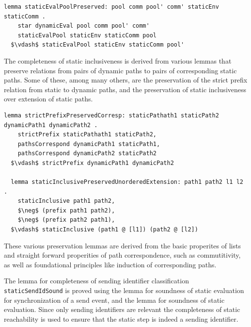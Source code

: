 \documentclass[letterpaper, 11pt]{extarticle}
\begin{document}
\begin{lstlisting}[language=logic, mathescape]
  lemma staticEvalPoolPreserved: pool comm pool' comm' staticEnv staticComm .
    star dynamicEval pool comm pool' comm' 
    staticEvalPool staticEnv staticComm pool
  $\vdash$ staticEvalPool staticEnv staticComm pool'
\end{lstlisting}

The completeness of static inclusiveness is derived from various lemmas that
preserve relations from pairs of dynamic paths to pairs of corresponding static paths.  
Some of these, among many others, are
the preservation of the strict prefix relation from static to dynamic paths,
and the preservation of static inclusiveness over extension of static paths.

\begin{lstlisting}[language=logic, mathescape]
  lemma strictPrefixPreservedCorresp: staticPathath1 staticPath2 dynamicPath1 dynamicPath2 .
    strictPrefix staticPathath1 staticPath2, 
    pathsCorrespond dynamicPath1 staticPath1,
    pathsCorrespond dynamicPath2 staticPath2
  $\vdash$ strictPrefix dynamicPath1 dynamicPath2

  lemma staticInclusivePreservedUnorderedExtension: path1 path2 l1 l2 .
    staticInclusive path1 path2, 
    $\neg$ (prefix path1 path2),
    $\neg$ (prefix path2 path1), 
  $\vdash$ staticInclusive (path1 @ [l1]) (path2 @ [l2])
\end{lstlisting}

These various preservation lemmas are derived from the basic properites of lists 
and straight forward properities of path correspondence, such as commutitivity, as
well as foundational principles like induction of corresponding paths.

The lemma for completeness of sending identifier classification \lstinline{staticSendIdSound}
is proved using the lemma for
soundness of static evaluation for synchronization of a send event,
and the lemma for soundness of static evaluation.
Since only sending identifiers are relevant the completeness of static reachability is
used to ensure that the static step is indeed a sending identifier. 
\end{document}
